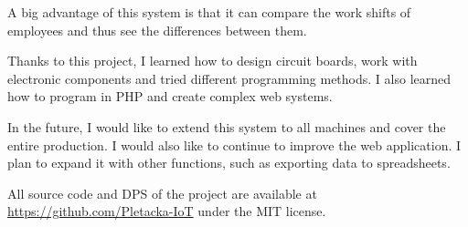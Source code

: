 \documentclass[12pt, a4paper]{article}
\begin{document}
A big advantage of this system is that it can compare the work shifts of employees and thus see the differences between them.

Thanks to this project, I learned how to design circuit boards, work with electronic components and tried different programming methods.
I also learned how to program in PHP and create complex web systems.

In the future, I would like to extend this system to all machines and cover the entire production.
I would also like to continue to improve the web application. I plan to expand it with other functions, such as exporting data to spreadsheets.

All source code and DPS of the project are available at \url{https://github.com/Pletacka-IoT} under the MIT license.


\newpage





\appendix
\end{document}
